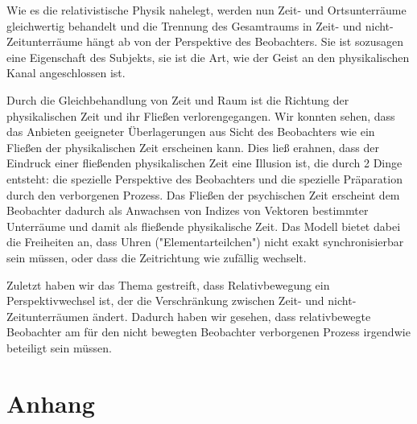 \documentclass[12pt]{article}
\begin{document}
Wie es die relativistische Physik nahelegt, werden nun Zeit- und Ortsunterräume gleichwertig behandelt und die Trennung des Gesamtraums in Zeit- und nicht-Zeitunterräume hängt ab von der Perspektive des Beobachters. Sie ist sozusagen eine Eigenschaft des Subjekts, sie ist die Art, wie der Geist an den physikalischen Kanal angeschlossen ist. 

Durch die Gleichbehandlung von Zeit und Raum ist die Richtung der physikalischen Zeit und ihr Fließen verlorengegangen. Wir konnten sehen, dass das Anbieten geeigneter Überlagerungen aus Sicht des Beobachters wie ein Fließen der physikalischen Zeit erscheinen kann. Dies ließ erahnen, dass der Eindruck einer fließenden physikalischen Zeit eine Illusion ist, die durch 2 Dinge entsteht: die spezielle Perspektive des Beobachters und die spezielle Präparation durch den verborgenen Prozess. Das Fließen der psychischen Zeit erscheint dem Beobachter dadurch als Anwachsen von Indizes von Vektoren bestimmter Unterräume und damit als fließende physikalische Zeit. Das Modell bietet dabei die Freiheiten an, dass Uhren ("Elementarteilchen") nicht exakt synchronisierbar sein müssen, oder dass die Zeitrichtung wie zufällig wechselt. 

Zuletzt haben wir das Thema gestreift, dass Relativbewegung ein Perspektivwechsel ist, der die Verschränkung zwischen Zeit- und nicht-Zeitunterräumen ändert. Dadurch haben wir gesehen, dass relativbewegte Beobachter am für den nicht bewegten Beobachter verborgenen Prozess irgendwie beteiligt sein müssen.

\section{Anhang}
\end{document}
